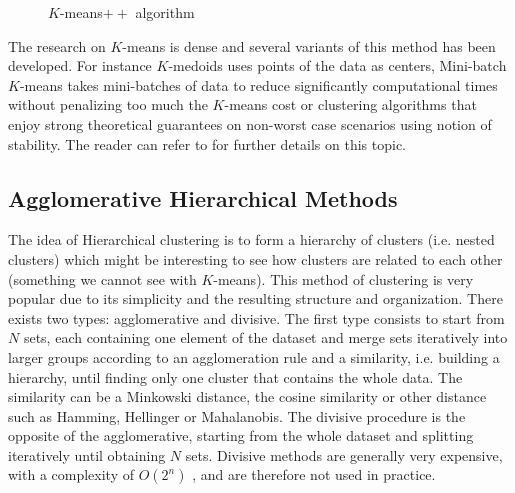 \begin{figure}[h]
\begin{center}
   \caption{$K$-means$++$ algorithm}
   \label{algo:kmeans++_algo}
\end{center}
\vspace{-15pt}
\end{figure}
The research on $K$-means is dense and several variants of this method has been developed. For instance $K$-medoids \citep{KaufmanR90} uses points of the data as centers, Mini-batch $K$-means\citep{Sculley:2010:WKC:1772690.1772862} takes mini-batches of data to reduce significantly computational times without penalizing too much the $K$-means cost or clustering algorithms that enjoy strong theoretical guarantees on non-worst case scenarios using notion of stability\citep{Ostrovsky2006}. The reader can refer to \citep{hennig2015handbook} for further details on this topic.

\subsection{Agglomerative Hierarchical Methods}
The idea of Hierarchical clustering is to form a hierarchy of clusters (i.e. nested clusters) which might be interesting to see how clusters are related to each other (something we cannot see with $K$-means). This method of clustering is very popular due to its simplicity and the resulting structure and organization. There exists two types: agglomerative and divisive. The first type consists to start from $N$ sets, each containing one element of the dataset and merge sets iteratively into larger groups according to an agglomeration rule and a similarity, i.e. building a hierarchy, until finding only one cluster that contains the whole data. The similarity can be a Minkowski distance, the cosine similarity or other distance such as Hamming, Hellinger or Mahalanobis.  The divisive procedure is the opposite of the agglomerative, starting from the whole dataset and splitting iteratively until obtaining $N$ sets. Divisive methods are generally very expensive, with a complexity of $O(2^n)$ , and are therefore not used in practice.

